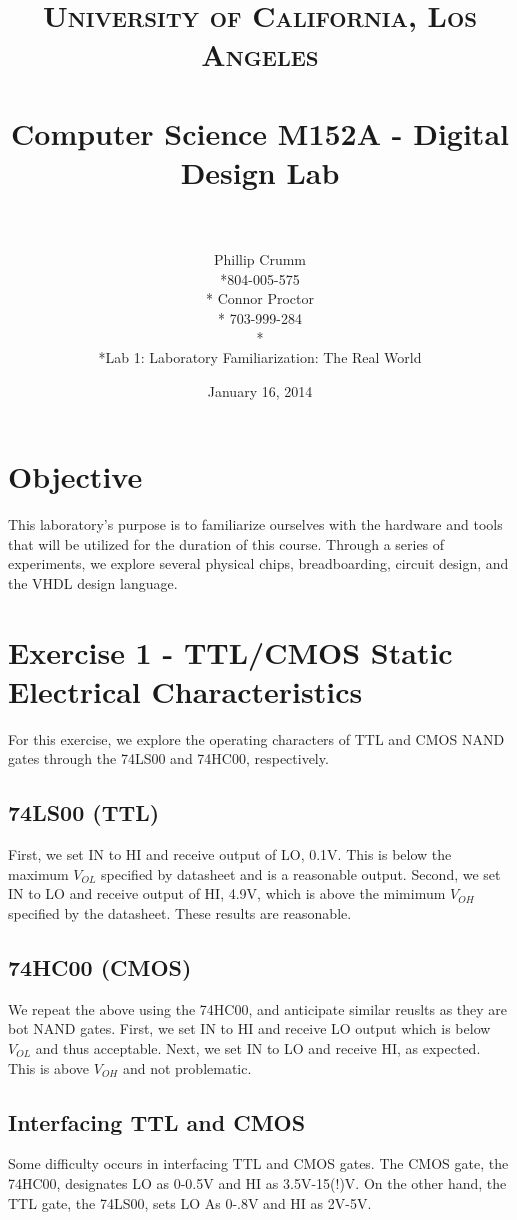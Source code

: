 \documentclass[paper=letter, fontsize=11pt]{scrartcl}
\title{	
\normalfont \normalsize 
\textsc{University of California, Los Angeles} \\ [25pt]
\horrule{0.5pt} \\[0.4cm]
\Large Computer Science M152A - Digital Design Lab \\
\horrule{2pt} \\[0.5cm]
}
\author{Phillip Crumm \\*804-005-575 \\* Connor Proctor \\* 703-999-284 \\* \\*Lab 1: Laboratory Familiarization: The Real World}
\date{\normalsize January 16, 2014}
\begin{document}
\clearpage\maketitle
\thispagestyle{empty}
\pagebreak


\section{Objective}
This laboratory's purpose is to familiarize ourselves with the hardware and tools that will be utilized for the duration of this course. Through a series of experiments, we explore several physical chips, breadboarding, circuit design, and the VHDL design language.

\section{Exercise 1 - TTL/CMOS Static Electrical Characteristics}
For this exercise, we explore the operating characters of TTL and CMOS NAND gates through the 74LS00 and 74HC00, respectively.

\subsection{74LS00 (TTL)}
First, we set IN to HI and receive output of LO, 0.1V. This is below the maximum $V_{OL}$ specified by datasheet and is a reasonable output. Second, we set IN to LO and receive output of HI, 4.9V, which is above the mimimum $V_{OH}$ specified by the datasheet. These results are reasonable.

\subsection{74HC00 (CMOS)}
We repeat the above using the 74HC00, and anticipate similar reuslts as they are bot NAND gates. First, we set IN to HI and receive LO output which is below $V_{OL}$ and thus acceptable. Next, we set IN to LO and receive HI, as expected. This is above $V_{OH}$ and not problematic.

\subsection{Interfacing TTL and CMOS}
Some difficulty occurs in interfacing TTL and CMOS gates. The CMOS gate, the 74HC00, designates LO as 0-0.5V and HI as 3.5V-15(!)V. On the other hand, the TTL gate, the 74LS00, sets LO As 0-.8V and HI as 2V-5V.
\end{document}
